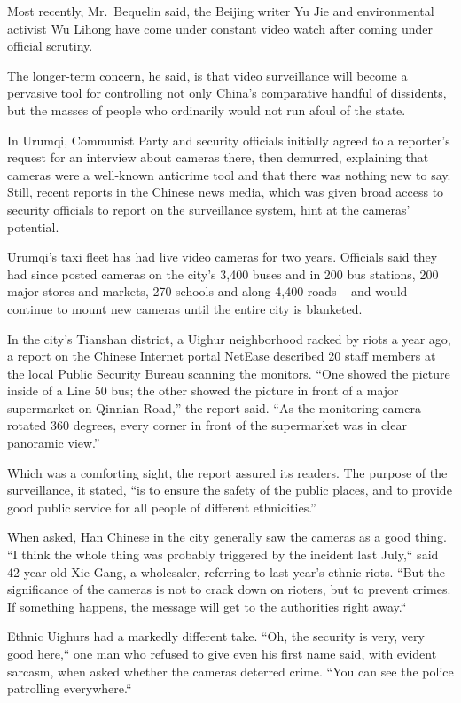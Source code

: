 ﻿\documentclass[12pt]{article}
\begin{document}
Most recently, Mr.~Bequelin said, the Beijing writer Yu Jie and environmental activist Wu Lihong
have come under constant video watch after coming under official scrutiny.

The longer-term concern, he said, is that video surveillance will become a pervasive tool for
controlling not only China's comparative handful of dissidents, but the masses of people who
ordinarily would not run afoul of the state.

In Urumqi, Communist Party and security officials initially agreed to a reporter's request for an
interview about cameras there, then demurred, explaining that cameras were a well-known anticrime
tool and that there was nothing new to say. Still, recent reports in the Chinese news media, which
was given broad access to security officials to report on the surveillance system, hint at the
cameras' potential.

Urumqi's taxi fleet has had live video cameras for two years. Officials said they had since posted
cameras on the city's 3,400 buses and in 200 bus stations, 200 major stores and markets, 270 schools
and along 4,400 roads -- and would continue to mount new cameras until the entire city is blanketed.

In the city's Tianshan district, a Uighur neighborhood racked by riots a year ago, a report on the
Chinese Internet portal NetEase described 20 staff members at the local Public Security Bureau
scanning the monitors. ``One showed the picture inside of a Line 50 bus; the other showed the
picture in front of a major supermarket on Qinnian Road,'' the report said. ``As the monitoring
camera rotated 360 degrees, every corner in front of the supermarket was in clear panoramic view.''

Which was a comforting sight, the report assured its readers. The purpose of the surveillance, it
stated, ``is to ensure the safety of the public places, and to provide good public service for all
people of different ethnicities.''

When asked, Han Chinese in the city generally saw the cameras as a good thing. ``I think the whole
thing was probably triggered by the incident last July,`` said 42-year-old Xie Gang, a wholesaler,
referring to last year's ethnic riots. ``But the significance of the cameras is not to crack down on
rioters, but to prevent crimes. If something happens, the message will get to the authorities right
away.``

Ethnic Uighurs had a markedly different take. ``Oh, the security is very, very good here,`` one man
who refused to give even his first name said, with evident sarcasm, when asked whether the cameras
deterred crime. ``You can see the police patrolling everywhere.``
\end{document}
